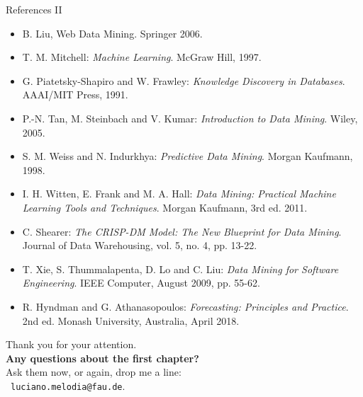 \documentclass[aspectratio=169,t]{beamer}
\begin{document}
  { 
    \begin{frame}{References II}
        \begin{itemize}
          \item B. Liu, Web Data Mining. Springer 2006.
          \item T. M. Mitchell: \emph{Machine Learning}. McGraw Hill, 1997.
          \item G. Piatetsky-Shapiro and W. Frawley: \emph{Knowledge Discovery in Databases}. AAAI/MIT Press, 1991.
          \item P.-N. Tan, M. Steinbach and V. Kumar: \emph{Introduction to Data Mining}. Wiley, 2005.
          \item S. M. Weiss and N. Indurkhya: \emph{Predictive Data Mining}. Morgan Kaufmann, 1998.
          \item I. H. Witten, E. Frank and M. A. Hall: \emph{Data Mining: Practical Machine Learning Tools and Techniques}. Morgan Kaufmann, 3rd ed. 2011.
          \item C. Shearer: \emph{The CRISP-DM Model: The New Blueprint for Data Mining}. Journal of Data Warehousing, vol. 5, no. 4, pp. 13-22.
          \item T. Xie, S. Thummalapenta, D. Lo and C. Liu: \emph{Data Mining for Software Engineering}. IEEE Computer, August 2009, pp. 55-62.
          \item R. Hyndman and G. Athanasopoulos: \emph{Forecasting: Principles and Practice}. 2nd ed. Monash University, Australia, April 2018.
        \end{itemize}
    \end{frame}
  }


  { %
    \begin{frame}[c]
      \begin{center}
        Thank you for your attention.\\
        {\bf Any questions about the first chapter?}\\[0.5cm]
        Ask them now, or again, drop me a line: \\ 
        \faSendO \ \texttt{luciano.melodia@fau.de}.
      \end{center}
    \end{frame}
  }
\end{document}
